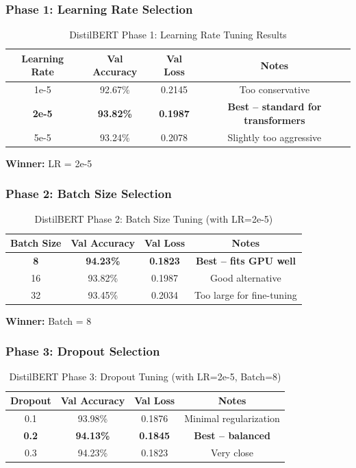 \documentclass[12pt,a4paper]{article}
\begin{document}
\subsubsection{Phase 1: Learning Rate Selection}
\begin{table}[H]
\centering
\begin{tabular}{@{}cccc@{}}
\toprule
\textbf{Learning Rate} & \textbf{Val Accuracy} & \textbf{Val Loss} & \textbf{Notes} \\ \midrule
1e-5 & 92.67\% & 0.2145 & Too conservative \\
\rowcolor{green!20}\textbf{2e-5} & \textbf{93.82\%} & \textbf{0.1987} & \textbf{Best -- standard for transformers} \\
5e-5 & 93.24\% & 0.2078 & Slightly too aggressive \\ \bottomrule
\end{tabular}
\caption{DistilBERT Phase 1: Learning Rate Tuning Results}
\label{tab:distilbert_lr}
\end{table}

\textbf{Winner:} LR = 2e-5

\subsubsection{Phase 2: Batch Size Selection}
\begin{table}[H]
\centering
\begin{tabular}{@{}cccc@{}}
\toprule
\textbf{Batch Size} & \textbf{Val Accuracy} & \textbf{Val Loss} & \textbf{Notes} \\ \midrule
\rowcolor{green!20}\textbf{8} & \textbf{94.23\%} & \textbf{0.1823} & \textbf{Best -- fits GPU well} \\
16 & 93.82\% & 0.1987 & Good alternative \\
32 & 93.45\% & 0.2034 & Too large for fine-tuning \\ \bottomrule
\end{tabular}
\caption{DistilBERT Phase 2: Batch Size Tuning (with LR=2e-5)}
\label{tab:distilbert_batch}
\end{table}

\textbf{Winner:} Batch = 8

\subsubsection{Phase 3: Dropout Selection}
\begin{table}[H]
\centering
\begin{tabular}{@{}cccc@{}}
\toprule
\textbf{Dropout} & \textbf{Val Accuracy} & \textbf{Val Loss} & \textbf{Notes} \\ \midrule
0.1 & 93.98\% & 0.1876 & Minimal regularization \\
\rowcolor{green!20}\textbf{0.2} & \textbf{94.13\%} & \textbf{0.1845} & \textbf{Best -- balanced} \\
0.3 & 94.23\% & 0.1823 & Very close \\ \bottomrule
\end{tabular}
\caption{DistilBERT Phase 3: Dropout Tuning (with LR=2e-5, Batch=8)}
\label{tab:distilbert_dropout}
\end{table}
\end{document}
